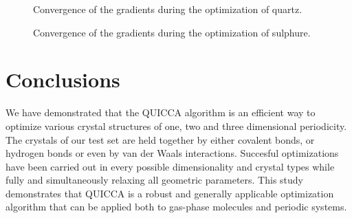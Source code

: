 \documentclass[prl,aps,preprint,superbib,12pt]{revtex4}
\begin{document}
\begin{figure}[h]
\caption{Convergence of the gradients during the optimization
of quartz.}
\label{Quartz-grads}
\end{figure}

\begin{figure}[h]
\caption{Convergence of the gradients during the optimization 
of sulphure.}
\label{Sulphure-grads}
\end{figure}

\section{Conclusions} \label{Conclusions}
We have demonstrated that the QUICCA algorithm is an efficient
way to optimize various crystal structures of one, two and three
dimensional periodicity. The crystals of our test set are held
together by either covalent bonds, or hydrogen bonds or even
by van der Waals interactions. Succesful optimizations
have been carried out in every possible dimensionality and crystal types
while fully and simultaneously relaxing all geometric parameters.
This study demonstrates that QUICCA is a robust and generally applicable
optimization algorithm that can be applied both to gas-phase
molecules and periodic systems.


\end{document}
